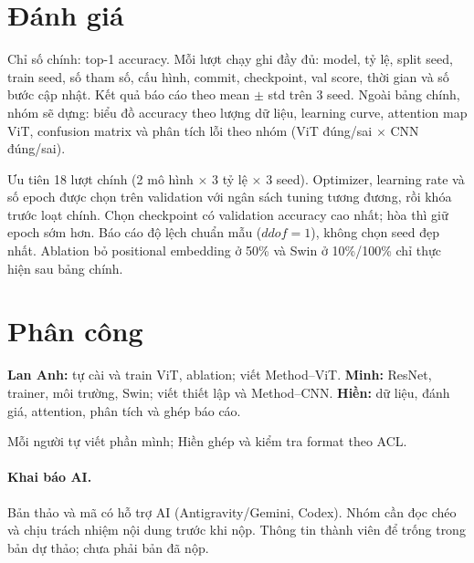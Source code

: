 \documentclass[11pt,a4paper]{article}
\begin{document}
\section{Đánh giá}

Chỉ số chính: top-1 accuracy. Mỗi lượt chạy ghi đầy đủ: model, tỷ lệ, split seed, train seed, số tham số, cấu hình, commit, checkpoint, val score, thời gian và số bước cập nhật. Kết quả báo cáo theo mean $\pm$ std trên 3 seed. Ngoài bảng chính, nhóm sẽ dựng: biểu đồ accuracy theo lượng dữ liệu, learning curve, attention map ViT, confusion matrix và phân tích lỗi theo nhóm (ViT đúng/sai $\times$ CNN đúng/sai).

Ưu tiên 18 lượt chính (2 mô hình $\times$ 3 tỷ lệ $\times$ 3 seed). Optimizer, learning rate và số epoch được chọn trên validation với ngân sách tuning tương đương, rồi khóa trước loạt chính. Chọn checkpoint có validation accuracy cao nhất; hòa thì giữ epoch sớm hơn. Báo cáo độ lệch chuẩn mẫu ($ddof=1$), không chọn seed đẹp nhất. Ablation bỏ positional embedding ở 50\% và Swin ở 10\%/100\% chỉ thực hiện sau bảng chính.

\section{Phân công}

\textbf{Lan Anh:} tự cài và train ViT, ablation; viết Method--ViT.
\textbf{Minh:} ResNet, trainer, môi trường, Swin; viết thiết lập và Method--CNN.
\textbf{Hiền:} dữ liệu, đánh giá, attention, phân tích và ghép báo cáo.

Mỗi người tự viết phần mình; Hiền ghép và kiểm tra format theo ACL.

\paragraph{Khai báo AI.}
Bản thảo và mã có hỗ trợ AI (Antigravity/Gemini, Codex). Nhóm cần đọc chéo và chịu trách nhiệm nội dung trước khi nộp. Thông tin thành viên để trống trong bản dự thảo; chưa phải bản đã nộp.


\end{document}

